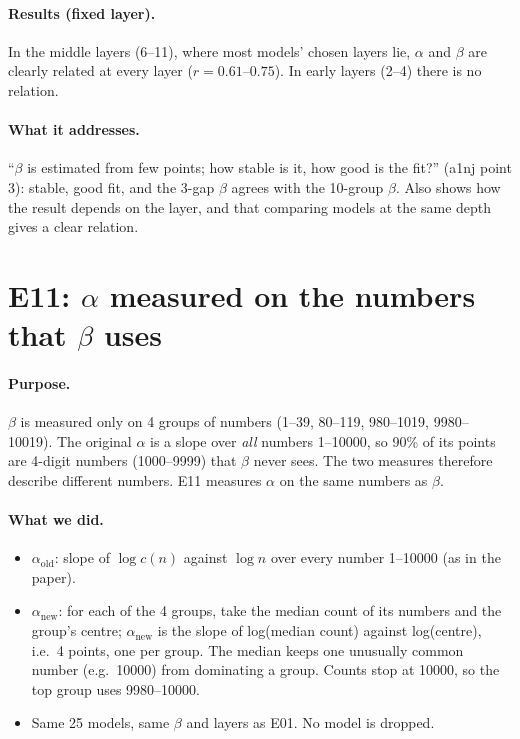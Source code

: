 \documentclass[11pt]{article}
\newcommand{\aold}{\alpha_{\text{old}}}
\newcommand{\anew}{\alpha_{\text{new}}}
\begin{document}
\paragraph{Results (fixed layer).} In the middle layers (6--11), where most models' chosen layers lie,
$\alpha$ and $\beta$ are clearly related at every layer ($r = 0.61$--$0.75$). In early layers (2--4) there
is no relation.

\paragraph{What it addresses.} ``$\beta$ is estimated from few points; how stable is it, how good is the
fit?'' (a1nj point 3): stable, good fit, and the 3-gap $\beta$ agrees with the 10-group $\beta$. Also
shows how the result depends on the layer, and that comparing models at the same depth gives a
clear relation.

\section{E11: $\alpha$ measured on the numbers that $\beta$ uses}

\paragraph{Purpose.} $\beta$ is measured only on 4 groups of numbers (1--39, 80--119, 980--1019,
9980--10019). The original $\alpha$ is a slope over \emph{all} numbers 1--10000, so 90\% of its points
are 4-digit numbers (1000--9999) that $\beta$ never sees. The two measures therefore describe
different numbers. E11 measures $\alpha$ on the same numbers as $\beta$.

\paragraph{What we did.}
\begin{itemize}
\item $\aold$: slope of $\log c(n)$ against $\log n$ over every number 1--10000 (as in the paper).
\item $\anew$: for each of the 4 groups, take the median count of its numbers and the group's centre;
  $\anew$ is the slope of log(median count) against log(centre), i.e.\ 4 points, one per group. The
  median keeps one unusually common number (e.g.\ 10000) from dominating a group. Counts stop at
  10000, so the top group uses 9980--10000.
\item Same 25 models, same $\beta$ and layers as E01. No model is dropped.
\end{itemize}
\end{document}
